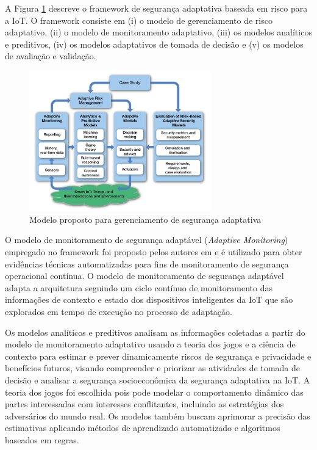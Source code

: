 \documentclass[tid,table]{texufpel} %
\begin{document}
A Figura \ref{adaptive-security-management-model} descreve o framework de segurança adaptativa baseada em risco para a IoT. O framework consiste em (i) o modelo de gerenciamento de risco adaptativo, (ii) o modelo de monitoramento adaptativo, (iii) os modelos analíticos e preditivos, (iv) os modelos adaptativos de tomada de decisão e (v) os modelos de avaliação e validação.

\begin{figure}[ht]
\centering
\includegraphics[width=0.7\textwidth]{imagens/adaptive-security-management-model.png}
\caption{Modelo proposto para gerenciamento de segurança adaptativa}
\label{adaptive-security-management-model}
\end{figure}

O modelo de monitoramento de segurança adaptável (\textit{Adaptive Monitoring}) empregado no framework foi proposto pelos autores em \cite{abie10} e é utilizado para obter evidências técnicas automatizadas para fins de monitoramento de segurança operacional contínua. O modelo de monitoramento de segurança adaptável adapta a arquitetura seguindo um ciclo contínuo de monitoramento das informações de contexto e estado dos dispositivos inteligentes da IoT que são explorados em tempo de execução no processo de adaptação.

Os modelos analíticos e preditivos analisam as informações coletadas  a partir do modelo de monitoramento adaptativo usando a teoria dos jogos e a ciência de contexto para estimar e prever dinamicamente riscos de segurança e privacidade e benefícios futuros, visando compreender e priorizar as atividades de tomada de decisão e analisar a segurança socioeconômica da segurança adaptativa na IoT. A teoria dos jogos foi escolhida pois pode modelar o comportamento dinâmico das partes interessadas com interesses conflitantes, incluindo as estratégias dos adversários do mundo real. Os modelos também buscam aprimorar a precisão das estimativas aplicando métodos de aprendizado automatizado e algoritmos baseados em regras.
\end{document}
